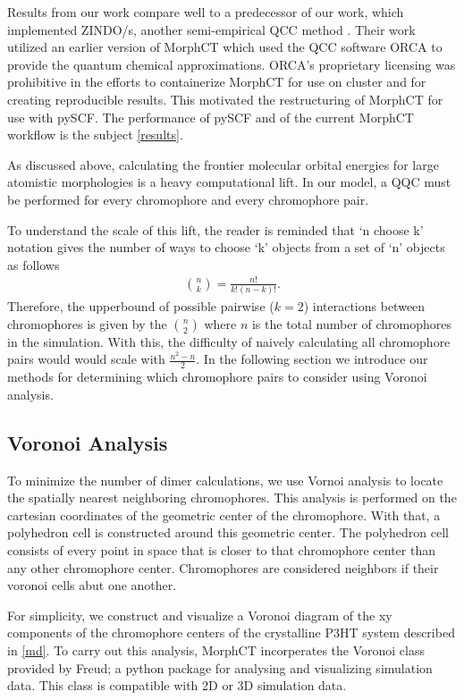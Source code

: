 Results from our work compare well to a predecessor of our work, which implemented ZINDO/s, another
semi-empirical QCC method \cite{Miller2018a}\cite{jones2017}. 
Their work utilized an earlier version of MorphCT which used the QCC software 
ORCA \cite{Neese2012b} to provide the quantum chemical approximations. 
ORCA's proprietary licensing was prohibitive in the efforts to containerize MorphCT for use on cluster and for
creating reproducible results. This motivated the restructuring of MorphCT for use with pySCF. The
performance of pySCF and of the current MorphCT workflow is the subject \autoref{results}.

As discussed above, calculating the frontier molecular orbital energies for large atomistic morphologies is
a heavy computational lift. 
In our model, a QQC must be performed for every chromophore and every chromophore pair. 

To understand the scale of this lift, the reader is reminded that
`n choose k' notation gives the number of ways to choose `k' objects from a set of 
`n' objects as follows 
\begin{align}
    {n \choose k} =  \frac{n!}{k!(n-k)!}.
\end{align}
Therefore, the upperbound of possible pairwise ($k=2$) interactions between chromophores is given by the 
$n \choose 2$ where $n$ is the total number of chromophores in the simulation. With this, the difficulty of
naively calculating all chromophore pairs would would scale with $\frac{n^{2} - n}{2}$. 
In the following section we introduce our methods for determining
which chromophore pairs to consider using Voronoi analysis. 

\subsection{Voronoi Analysis}

To minimize the number of dimer calculations, we use Vornoi analysis to locate the spatially
nearest neighboring chromophores. This analysis is performed on the cartesian coordinates of
the geometric center of the chromophore. With that, a polyhedron cell is constructed around this geometric
center. The polyhedron cell consists of every point in space that is closer to that chromophore center than
any other chromophore center. Chromophores are considered neighbors if their voronoi cells abut one another.

For simplicity, we construct and visualize a Voronoi diagram of the xy components of the chromophore centers
of the crystalline P3HT system described in \autoref{md}. To carry out this analysis, MorphCT incorperates the
Voronoi class provided by Freud; a python package for analysing and visualizing simulation data\cite{Ramasubramani2020}. 
This class is compatible with 2D or 3D simulation data. 

